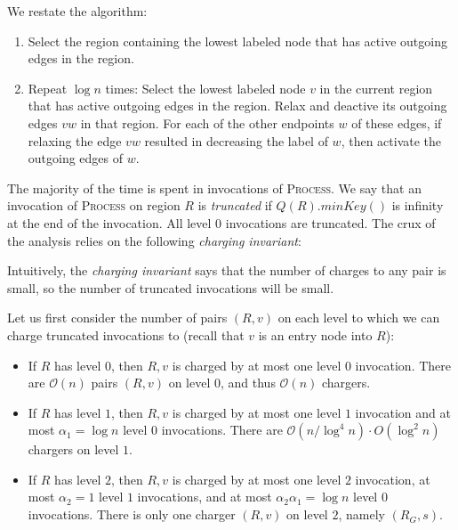 \documentclass[11pt]{article}
\begin{document}
We restate the algorithm:
\begin{enumerate}
\item Select the region containing the lowest labeled node that has active outgoing edges in the region.
\item Repeat $\log n$ times: Select the lowest labeled node $v$ in the current region that has active outgoing edges in the region. Relax and deactive its outgoing edges $vw$ in that region. For each of the other endpoints $w$ of these edges, if relaxing the edge $vw$ resulted in decreasing the label of $w$, then activate the outgoing edges of $w$.
\end{enumerate}

The majority of the time is spent in invocations of \textsc{Process}. We say that an invocation of \textsc{Process} on region $R$ is \emph{truncated} if $Q(R).minKey()$ is infinity at the end of the invocation. All level $0$ invocations are truncated. The crux of the analysis relies on the following \emph{charging invariant}:

\noindent{}

Intuitively, the \emph{charging invariant} says that the number of charges to any pair is small, so the number of truncated invocations will be small.

 Let us first consider the number of pairs $(R,v)$ on each level to which we can charge truncated invocations to (recall that $v$ is an entry node into $R$):
\begin{itemize}
\item If $R$ has level $0$, then $R,v$ is charged by at most one level $0$ invocation. There are $\mathcal{O}(n)$ pairs $(R,v)$ on level $0$, and thus $\mathcal{O}(n)$ chargers.
\item If $R$ has level $1$, then $R,v$ is charged by at most one level $1$ invocation and at most $\alpha_1 = \log n$ level $0$ invocations. There are $\mathcal{O}(n/\log^4n)\cdot O(\log^2 n)$ chargers on level $1$.
\item If $R$ has level $2$, then $R,v$ is charged by at most one level $2$ invocation, at most $\alpha_2 = 1$ level $1$ invocations, and at most $\alpha_2\alpha_1 = \log n$ level $0$ invocations. There is only one charger $(R,v)$ on level $2$, namely $(R_G,s)$.
\end{itemize}
\end{document}
